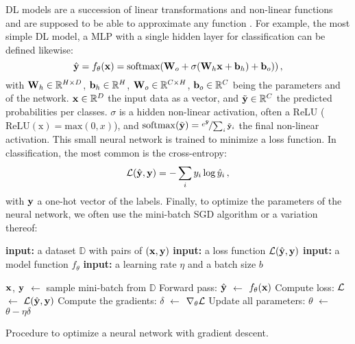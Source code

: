\ac{DL} models are a succession of linear transformations and non-linear functions and are supposed
to be able to approximate any function \citep{gelenbe1999universalapprox}. For example, the most simple \ac{DL}
model, a \ac{MLP} with a single hidden layer for classification can be defined likewise:
%
\begin{equation}
      \hat{\mathbf{y}} = f_\theta(\mathbf{x}) = \operatorname{softmax}(\mathbf{W}_o + \sigma(\mathbf{W}_h \mathbf{x} + \mathbf{b}_h) + \mathbf{b}_o))\,,
      \label{eq:intro_mlp}
\end{equation}
%
with $\mathbf{W}_h \in \mathbb{R}^{H \times D}$, $\mathbf{b}_h \in \mathbb{R}^{H}$,
$\mathbf{W}_o \in \mathbb{R}^{C \times H}$, $\mathbf{b}_o \in \mathbb{R}^{C}$ being the parameters and of the
network. $\mathbf{x} \in \mathbb{R}^D$ the input data as a vector, and $\tilde{\mathbf{y}} \in \mathbb{R}^C$ the
predicted probabilities per classes. $\sigma$ is a hidden non-linear activation, often a \ac{ReLU}
($\operatorname{ReLU(x)} = \text{max}(0, x)$), and $\operatorname{softmax}(\tilde{\mathbf{y}}) =
      \nicefrac{e^{\tilde{\mathbf{y}}}}{\sum_{i} \tilde{\mathbf{y}}_i}$ the final non-linear activation. This small
neural network is trained to minimize a loss function. In classification, the most common is the
cross-entropy:
%
\begin{equation}
      \mathcal{L}(\hat{\mathbf{y}}, \mathbf{y}) = -\sum_i y_i \log \hat{y}_i\,,
      \label{eq:intro_ce}
\end{equation}
%
with $\mathbf{y}$ a one-hot vector of the labels. Finally, to optimize the parameters of the neural
network, we often use the mini-batch \ac{SGD} algorithm or a variation thereof:

\begin{algorithm}
      \begin{algorithmic}[1]
            \Statex \textbf{input:} a dataset $\mathbb{D}$ with pairs of $(\mathbf{x}, \mathbf{y})$
            \Statex \textbf{input:} a loss function $\mathcal{L}(\hat{\mathbf{y}}, \mathbf{y})$
            \Statex \textbf{input:} a model function $f_\theta$
            \Statex \textbf{input:} a learning rate $\eta$ and a batch size $b$
            \Statex

            \State $\mathbf{x}$, $\mathbf{y}$ $\gets$ sample mini-batch from $\mathbb{D}$
            \State Forward pass: $\hat{\mathbf{y}}$ $\gets$ $f_\theta(\mathbf{x})$
            \State Compute loss: $\mathcal{L}$ $\gets$ $\mathcal{L}(\hat{\mathbf{y}}, \mathbf{y})$
            \State Compute the gradients: $\delta$ $\gets$ $\nabla_\theta \mathcal{L}$
            \State Update all parameters: $\theta$ $\gets$ $\theta - \eta \delta$
            \EndWhile
      \end{algorithmic}
      \caption{Procedure to optimize a neural network with gradient descent.}
      \label{algo:intro_sgd}
\end{algorithm}

